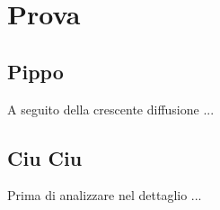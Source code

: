 \chapter{Prova}\label{cap:prova}

\section{Pippo}\label{sez:pippo}

A seguito della crescente diffusione ...

\section{Ciu Ciu}\label{sec:ciu_ciu}

Prima di analizzare nel dettaglio ...
